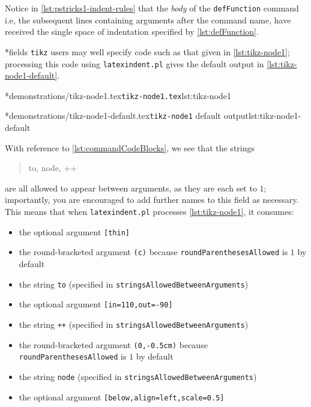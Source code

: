 	Notice in \cref{lst:pstricks1-indent-rules} that the \emph{body} of the \lstinline!defFunction! command i.e, the subsequent lines containing arguments after the command name, have received the single space of indentation specified by \cref{lst:defFunction}.

*{fields}
	\texttt{tikz} users may well specify code such as that given in \cref{lst:tikz-node1}; processing this code using \texttt{latexindent.pl} gives the default output in \cref{lst:tikz-node1-default}.

	\begin{minipage}{.45\textwidth}
		\cmhlistingsfromfile[columns=fixed]*{demonstrations/tikz-node1.tex}{\texttt{tikz-node1.tex}}{lst:tikz-node1}
	\end{minipage}
	\hfill
	\begin{minipage}{.45\textwidth}
		\cmhlistingsfromfile[columns=fixed]*{demonstrations/tikz-node1-default.tex}{\texttt{tikz-node1} default output}{lst:tikz-node1-default}
	\end{minipage}

	With reference to \vref{lst:commandCodeBlocks}, we see that the strings \begin{quote} to, node, ++ \end{quote} are all allowed to appear between arguments, as they are each set to $1$; importantly, you are encouraged to add further names to this field as necessary.
	This means that when \texttt{latexindent.pl} processes \cref{lst:tikz-node1}, it consumes: \begin{itemize} \item the optional argument \lstinline![thin]!
		\item the round-bracketed argument \lstinline!(c)! because \texttt{roundParenthesesAllowed} is $1$ by default
		\item the string \lstinline!to! (specified in \texttt{stringsAllowedBetweenArguments})
		\item the optional argument \lstinline![in=110,out=-90]!
		\item the string \lstinline!++! (specified in \texttt{stringsAllowedBetweenArguments})
		\item the round-bracketed argument \lstinline!(0,-0.5cm)! because \texttt{roundParenthesesAllowed} is $1$ by default
		\item the string \lstinline!node! (specified in \texttt{stringsAllowedBetweenArguments})
		\item the optional argument \lstinline![below,align=left,scale=0.5]! \end{itemize} 

